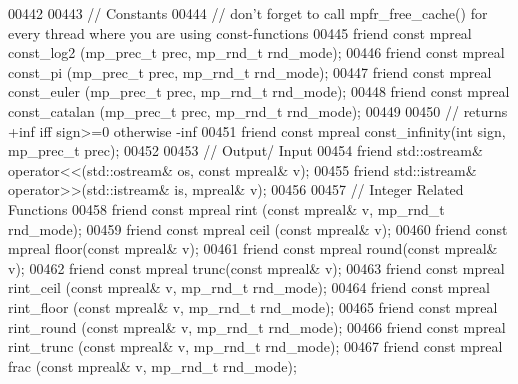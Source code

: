 \begin{DoxyCode}
00442 
00443     \textcolor{comment}{// Constants}
00444     \textcolor{comment}{// don't forget to call mpfr\_free\_cache() for every thread where you are using const-functions}
00445     \textcolor{keyword}{friend} \textcolor{keyword}{const} mpreal const\_log2      (mp\_prec\_t prec, mp\_rnd\_t rnd\_mode);
00446     \textcolor{keyword}{friend} \textcolor{keyword}{const} mpreal const\_pi        (mp\_prec\_t prec, mp\_rnd\_t rnd\_mode);
00447     \textcolor{keyword}{friend} \textcolor{keyword}{const} mpreal const\_euler     (mp\_prec\_t prec, mp\_rnd\_t rnd\_mode);
00448     \textcolor{keyword}{friend} \textcolor{keyword}{const} mpreal const\_catalan   (mp\_prec\_t prec, mp\_rnd\_t rnd\_mode);
00449 
00450     \textcolor{comment}{// returns +inf iff sign>=0 otherwise -inf}
00451     \textcolor{keyword}{friend} \textcolor{keyword}{const} mpreal const\_infinity(\textcolor{keywordtype}{int} sign, mp\_prec\_t prec);
00452 
00453     \textcolor{comment}{// Output/ Input}
00454     \textcolor{keyword}{friend} std::ostream& operator<<(std::ostream& os, \textcolor{keyword}{const} mpreal& v);
00455     \textcolor{keyword}{friend} std::istream& operator>>(std::istream& is, mpreal& v);
00456 
00457     \textcolor{comment}{// Integer Related Functions}
00458     \textcolor{keyword}{friend} \textcolor{keyword}{const} mpreal rint (\textcolor{keyword}{const} mpreal& v, mp\_rnd\_t rnd\_mode);
00459     \textcolor{keyword}{friend} \textcolor{keyword}{const} mpreal ceil (\textcolor{keyword}{const} mpreal& v);
00460     \textcolor{keyword}{friend} \textcolor{keyword}{const} mpreal floor(\textcolor{keyword}{const} mpreal& v);
00461     \textcolor{keyword}{friend} \textcolor{keyword}{const} mpreal round(\textcolor{keyword}{const} mpreal& v);
00462     \textcolor{keyword}{friend} \textcolor{keyword}{const} mpreal trunc(\textcolor{keyword}{const} mpreal& v);
00463     \textcolor{keyword}{friend} \textcolor{keyword}{const} mpreal rint\_ceil   (\textcolor{keyword}{const} mpreal& v, mp\_rnd\_t rnd\_mode);
00464     \textcolor{keyword}{friend} \textcolor{keyword}{const} mpreal rint\_floor  (\textcolor{keyword}{const} mpreal& v, mp\_rnd\_t rnd\_mode);
00465     \textcolor{keyword}{friend} \textcolor{keyword}{const} mpreal rint\_round  (\textcolor{keyword}{const} mpreal& v, mp\_rnd\_t rnd\_mode);
00466     \textcolor{keyword}{friend} \textcolor{keyword}{const} mpreal rint\_trunc  (\textcolor{keyword}{const} mpreal& v, mp\_rnd\_t rnd\_mode);
00467     \textcolor{keyword}{friend} \textcolor{keyword}{const} mpreal frac        (\textcolor{keyword}{const} mpreal& v, mp\_rnd\_t rnd\_mode);

\end{DoxyCode}
